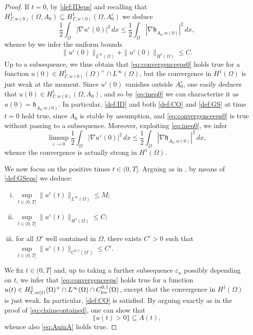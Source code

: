 \documentclass[a4paper,11pt,reqno]{amsart}
\numberwithin{equation}{section}
\theoremstyle{definition}
\theoremstyle{remark}
\begin{document}
\begin{proof}
If $t=0$, by \ref{def:IDeps} and recalling that $H^1_{\Gamma, w(0)}(\Omega, A_0)\subseteq H^1_{\Gamma, w(0)}(\Omega, A^\varepsilon_0)$ we deduce
\begin{equation}\label{eq:ineq0}
    \frac 12\int_\Omega |\nabla u^\varepsilon(0)|^2\, dx\le \frac 12\int_\Omega |\nabla \mathfrak{h}_{A_0,w(0)}|^2\, dx,
\end{equation}
whence by  we infer the uniform bounds
\begin{equation}    \|u^\varepsilon(0)\|_{L^\infty(\Omega)}+\|u^\varepsilon(0)\|_{H^1(\Omega)}\le C.
\end{equation}
Up to a subsequence, we thus obtain that \eqref{eq:convergenceeps0} holds true for a function $u(0)\in H^1_{\Gamma,w(0)}(\Omega)^+\cap L^\infty(\Omega)$, but the convergence in $H^1(\Omega)$ is just weak at the moment. Since $u^\varepsilon(0)$ vanishes outside $A_0^\varepsilon$, one easily deduces that $u(0)\in H^1_{\Gamma,w(0)}(\Omega,A_0)$, and so by \eqref{eq:ineq0} we can characterize it as $u(0)=\mathfrak{h}_{A_0,w(0)}$. In particular, \ref{def:ID} and both \ref{def:CO} and \ref{def:GS} at time $t=0$ hold true, since $A_0$ is stable by assumption, and \eqref{eq:convergenceeps0} is true without passing to a subsequence. Moreover, exploiting \eqref{eq:ineq0}, we infer
\begin{equation}
     \limsup\limits_{\varepsilon\to 0}\frac 12\int_\Omega |\nabla u^\varepsilon(0)|^2\, dx\le \frac 12\int_\Omega |\nabla \mathfrak{h}_{A_0,w(0)}|^2\, dx,
\end{equation}
whence the convergence is actually strong in $H^1(\Omega)$.

We now focus on the positive times $t\in(0,T]$. Arguing as in , by means of \ref{def:GSeps} we deduce:
    \begin{enumerate}[(i)]
    \item $\sup\limits_{t\in (0,T]}\|u^\varepsilon(t)\|_{L^\infty(\Omega)}\le M$;
    \item $\sup\limits_{t\in (0,T]}\|u^\varepsilon(t)\|_{H^1(\Omega)}\le C$;
    \item for all $\Omega'$ well contained in $\Omega$, there exists $C'>0$ such that $\sup\limits_{t\in (0,T]}\|u^\varepsilon(t)\|_{C^{0,1}(\Omega')}\le C'$.
\end{enumerate}
We fix $t\in (0,T]$ and, up to taking a further subsequence $\varepsilon_n$ possibly depending on $t$, we infer that \eqref{eq:convergenceeps} holds true for a function $u(t)\in H^1_{\Gamma,w(t)}(\Omega)^+\cap L^\infty(\Omega)\cap C^{0,1}_{\rm loc}(\Omega)$, except that the convergence in $H^1(\Omega)$ is just weak. In particular, \ref{def:CO} is satisfied. By arguing exactly as in the proof of \eqref{eq:claimcontained}, one can show that
\begin{equation}
    \{ u(t)>0\}\subseteq A(t),
\end{equation}
whence also \eqref{eq:AuinA} holds true.


\end{proof}
\end{document}
